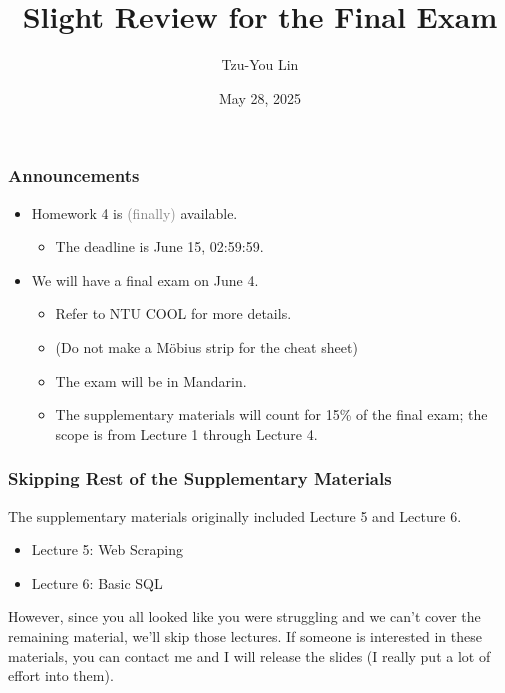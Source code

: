 \documentclass[10pt]{beamer}
\title{Slight Review for the Final Exam}
\author{Tzu-You Lin}
\date{May 28, 2025}
\begin{document}
\begin{frame}[fragile]
  \titlepage
\end{frame}

\begin{frame}
	\frametitle{Announcements}

	\begin{itemize}
		\item Homework 4 is \textcolor{gray}{(finally)} available.
		\begin{itemize}
			\item The deadline is June 15, 02:59:59.
		\end{itemize}
		\item We will have a final exam on June 4.
		\begin{itemize}
			\item Refer to NTU COOL for more details. 
			\item (Do not make a Möbius strip for the cheat sheet)
			\item The exam will be in Mandarin.
			\item The supplementary materials will count for 15\% of the final exam; the scope is from Lecture 1 through Lecture 4.
		\end{itemize}
	\end{itemize}
\end{frame}


\begin{frame}
	\frametitle{Skipping Rest of the Supplementary Materials}

	The supplementary materials originally included Lecture 5 and Lecture 6.
	\begin{itemize}
		\item Lecture 5: Web Scraping
		\item Lecture 6: Basic SQL
	\end{itemize}

	However, since you all looked like you were struggling and we can't cover the remaining material, we'll skip those lectures. If someone is interested in these materials, you can contact me and I will release the slides (I really put a lot of effort into them).
\end{frame}
\end{document}
